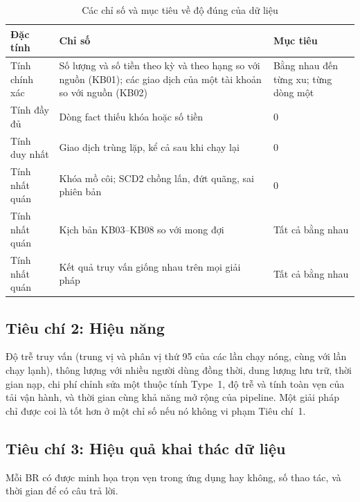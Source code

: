 \documentclass[peerreview]{IEEEtran}
\begin{document}
\begin{table}[!t]
\centering
\caption{Các chỉ số và mục tiêu về độ đúng của dữ liệu}
\label{tab:correctness-criteria}
\footnotesize
\setlength{\tabcolsep}{3pt}
\begin{tabular}{L{1.85cm} L{3.9cm} L{1.5cm}}
\toprule
\textbf{Đặc tính} & \textbf{Chỉ số} & \textbf{Mục tiêu} \\
\midrule
Tính chính xác & Số lượng và số tiền theo kỳ và theo hạng so với nguồn (KB01); các giao dịch của một tài khoản so với nguồn (KB02) & Bằng nhau đến từng xu; từng dòng một \\
Tính đầy đủ & Dòng fact thiếu khóa hoặc số tiền & 0 \\
Tính duy nhất & Giao dịch trùng lặp, kể cả sau khi chạy lại & 0 \\
Tính nhất quán & Khóa mồ côi; SCD2 chồng lấn, đứt quãng, sai phiên bản & 0 \\
Tính nhất quán & Kịch bản KB03--KB08 so với mong đợi & Tất cả bằng nhau \\
Tính nhất quán & Kết quả truy vấn giống nhau trên mọi giải pháp & Tất cả bằng nhau \\
\bottomrule
\end{tabular}
\end{table}

\subsection{Tiêu chí 2: Hiệu năng}
Độ trễ truy vấn (trung vị và phân vị thứ 95 của các lần chạy nóng, cùng với lần chạy lạnh),
thông lượng với nhiều người dùng đồng thời, dung lượng lưu trữ, thời gian nạp, chi phí chỉnh
sửa một thuộc tính Type~1, độ trễ và tính toàn vẹn của tải vận hành, và thời gian cùng khả
năng mở rộng của pipeline. Một giải pháp chỉ được coi là tốt hơn ở một chỉ số nếu nó không vi
phạm Tiêu chí~1.

\subsection{Tiêu chí 3: Hiệu quả khai thác dữ liệu}
Mỗi BR có được minh họa trọn vẹn trong ứng dụng hay không, số thao tác, và thời gian để có
câu trả lời.
\end{document}
